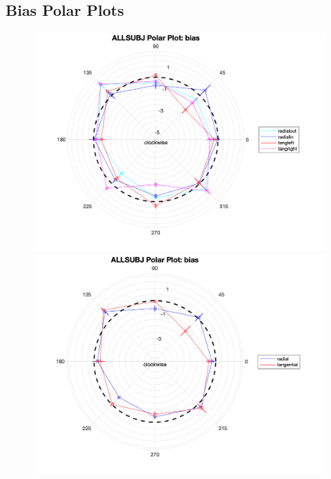 \documentclass[11pt]{article} %
\begin{document}
\subsection{Bias Polar Plots}
\begin{figure}[H]
\centering %
\includegraphics[scale=.35]{Images/ALLSUBJ_PP_bias_Alldata_4conds.png}
\includegraphics[scale=.35]{Images/ALLSUBJ_PP_bias_Alldata_2conds.png}
\end{figure}
\end{document}
